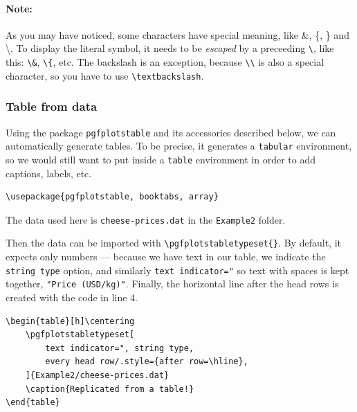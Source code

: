 \paragraph{Note:} As you may have noticed, some characters have special meaning, like \&, \{, \} and \textbackslash. To display the literal symbol, it needs to be \emph{escaped} by a preceeding \verb|\|, like this: \verb|\&|, \verb|\{|, etc. The backslash is an exception, because \verb|\\| is also a special character, so you have to use \verb|\textbackslash|.

\subsubsection{Table from data}
Using the package \texttt{pgfplotstable} and its accessories described below, we can automatically generate tables.
To be precise, it generates a \texttt{tabular} environment, so we would still want to put inside a \texttt{table} environment in order to add captions, labels, etc.
  
\begin{lstlisting}
\usepackage{pgfplotstable, booktabs, array}
\end{lstlisting}

The data used here is \texttt{cheese-prices.dat} in the \texttt{Example2} folder.


Then the data can be imported with \verb|\pgfplotstabletypeset{}|.
By default, it expects only numbers --- because we have text in our table, we indicate the \texttt{string type} option, and similarly \verb|text indicator="| so text with spaces is kept together, \verb|"Price (USD/kg)"|. 
Finally, the horizontal line after the head rows is created with the code in line 4.
\begin{lstlisting}
\begin{table}[h]\centering
    \pgfplotstabletypeset[
        text indicator=", string type,
        every head row/.style={after row=\hline},
    ]{Example2/cheese-prices.dat}
    \caption{Replicated from a table!}
\end{table}     
\end{lstlisting}

\begin{table}[h]\centering
    \caption{Replicated from a table!}
\end{table}     

